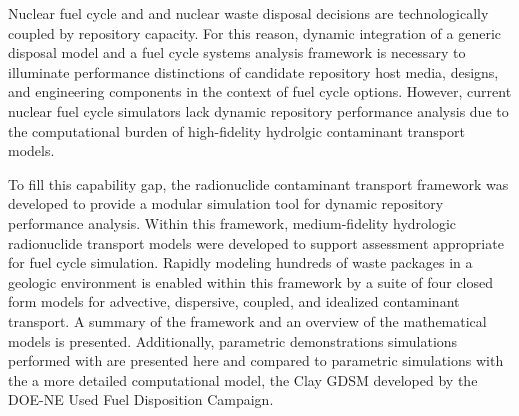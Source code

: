 

Nuclear fuel cycle and and nuclear waste disposal decisions are
technologically coupled by repository capacity.  For this reason, dynamic
integration of a generic disposal model and a fuel cycle systems analysis
framework is necessary to illuminate performance distinctions of candidate
repository host media, designs, and engineering components in the context of
fuel cycle options. However, current nuclear fuel cycle simulators lack dynamic
repository performance analysis due to the computational burden of
high-fidelity hydrolgic contaminant transport models.

To fill this capability gap, the \Cyder radionuclide contaminant transport
framework was developed to provide a modular simulation tool for dynamic repository performance
analysis.  Within this framework, medium-fidelity hydrologic radionuclide
transport models were developed to support assessment appropriate for fuel
cycle simulation. Rapidly modeling hundreds of waste packages in a geologic
environment is enabled within this framework by a suite of four closed form
models for advective, dispersive, coupled, and idealized contaminant transport.
A summary of the framework and an overview of the mathematical models is
presented. Additionally, parametric demonstrations simulations performed with
\Cyder are presented here and compared to parametric simulations with the
a more detailed computational model, the Clay \gls{GDSM} developed by the
DOE-NE Used Fuel Disposition Campaign.
